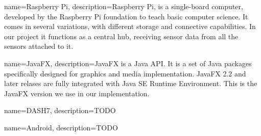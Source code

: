 \documentclass[../document]{subfiles}
\begin{document}
{
   name=Raspberry Pi,
   description={Raspberry Pi, is a single-board computer, developed by the Raspberry Pi foundation to teach basic computer science. It comes in several variations, with different storage and connective capabilities. In our project it functions as a central hub, receiving sensor data from all the sensors attached to it.}
}

{
   name=JavaFX,
   description={JavaFX is a Java API. It is a set of Java packages specifically designed for graphics and media implementation. JavaFX 2.2 and later relases are fully integrated with Java SE Runtime Environment. This is the JavaFX version we use in our implementation.}
}

{
   name=DASH7,
   description={TODO}
}

{
   name=Android,
   description={TODO}
}
\end{document}
